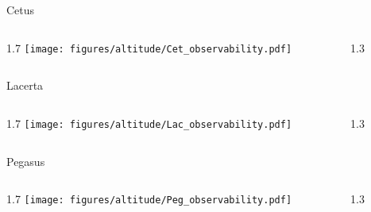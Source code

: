 \documentclass[final]{beamer}
\newlength{\colwidth}
\begin{document}
\begin{frame}[t]{}
    \Large{Cetus}
    \begin{columns}[T]
        \begin{column}{1.7\colwidth}
            \centering
            \texttt{[image: figures/altitude/Cet\_observability.pdf]}
        \end{column}
        \begin{column}{1.3\colwidth}
            \Large
            
        \end{column}
    \end{columns}

    \Large{Lacerta}
    \begin{columns}[T]
        \begin{column}{1.7\colwidth}
            \centering
            \texttt{[image: figures/altitude/Lac\_observability.pdf]}
        \end{column}
        \begin{column}{1.3\colwidth}
            \Large
            
        \end{column}
    \end{columns}

    \Large{Pegasus}
    \begin{columns}[T]
        \begin{column}{1.7\colwidth}
            \centering
            \texttt{[image: figures/altitude/Peg\_observability.pdf]}
        \end{column}
        \begin{column}{1.3\colwidth}
            \Large
            
        \end{column}
    \end{columns}
\end{frame}

\end{document}
